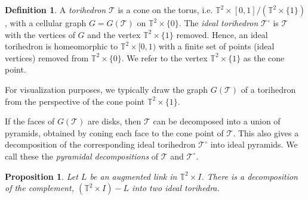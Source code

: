 \documentclass[11pt]{amsart}
\newcommand{\torus}{{\mathbb{T}^2}}
\newcommand{\sT}{{\mathcal{T}}}
\theoremstyle{plain}
\newtheorem{prop}[theorem]{Proposition}
\theoremstyle{definition}
\newtheorem{define}[theorem]{Definition}
\begin{document}
\begin{define}\cite{CKP2}
\label{def:torihedron}
A \emph{torihedron} $\sT$ is a cone on the torus, 
i.e. $\torus \times [0,1]/(\torus \times \{1\})$, with a cellular graph
$G = G(\sT)$ on $\torus \times \{0\}$.
The \emph{ideal torihedron} $\sT^\circ$ is $\sT$ with the
vertices of $G$ and the vertex $\torus \times \{1\}$ removed. Hence, an ideal
torihedron is homeomorphic to $\torus \times [0,1)$ with a finite set of points
(ideal vertices) removed from $\torus \times \{0\}$.
We refer to the vertex $\torus \times \{1\}$ as the cone point.
\end{define}


For visualization purposes, we typically draw the graph $G(\sT)$ of a
torihedron from the perspective of the cone point $\torus \times \{1\}$.

If the faces of $G(\sT)$ are disks,
then $\sT$ can be decomposed into a union of pyramids,
obtained by coning each face to the cone point of $\sT$.
This also gives a decomposition of the corresponding ideal torihedron
$\sT^\circ$ into ideal pyramids.
We call these the \emph{pyramidal decompositions} of $\sT$ and $\sT^\circ$.

\begin{prop}\label{p:tori_decomp}
Let $L$ be an augmented link in $\torus \times I$.
There is a decomposition of the complement,
$(\torus \times I) - L$ into two ideal torihedra.
\end{prop}
\end{document}

